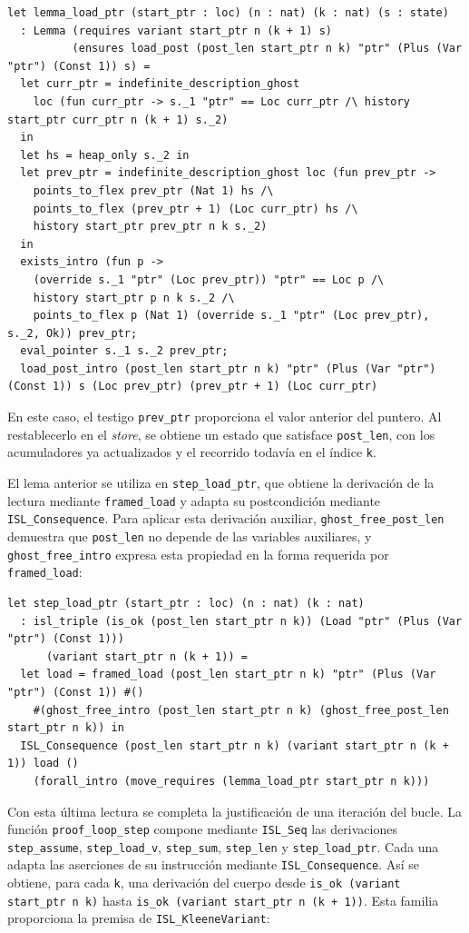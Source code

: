\documentclass[a4paper,	11pt]{report}
\begin{document}
\begin{lstlisting}
let lemma_load_ptr (start_ptr : loc) (n : nat) (k : nat) (s : state)
  : Lemma (requires variant start_ptr n (k + 1) s)
          (ensures load_post (post_len start_ptr n k) "ptr" (Plus (Var "ptr") (Const 1)) s) =
  let curr_ptr = indefinite_description_ghost
    loc (fun curr_ptr -> s._1 "ptr" == Loc curr_ptr /\ history start_ptr curr_ptr n (k + 1) s._2)
  in
  let hs = heap_only s._2 in
  let prev_ptr = indefinite_description_ghost loc (fun prev_ptr ->
    points_to_flex prev_ptr (Nat 1) hs /\
    points_to_flex (prev_ptr + 1) (Loc curr_ptr) hs /\
    history start_ptr prev_ptr n k s._2)
  in
  exists_intro (fun p ->
    (override s._1 "ptr" (Loc prev_ptr)) "ptr" == Loc p /\
    history start_ptr p n k s._2 /\
    points_to_flex p (Nat 1) (override s._1 "ptr" (Loc prev_ptr), s._2, Ok)) prev_ptr;
  eval_pointer s._1 s._2 prev_ptr;
  load_post_intro (post_len start_ptr n k) "ptr" (Plus (Var "ptr") (Const 1)) s (Loc prev_ptr) (prev_ptr + 1) (Loc curr_ptr)
\end{lstlisting}
En este caso,
el testigo \lstinline|prev_ptr| proporciona el valor anterior del puntero.
Al restablecerlo en el \emph{store},
se obtiene un estado que satisface \lstinline|post_len|,
con los acumuladores ya actualizados y el recorrido todavía en el índice \lstinline|k|.

El lema anterior se utiliza en \lstinline|step_load_ptr|,
que obtiene la derivación de la lectura mediante \lstinline|framed_load| y adapta su postcondición mediante \lstinline|ISL_Consequence|.
Para aplicar esta derivación auxiliar,
\lstinline|ghost_free_post_len| demuestra que \lstinline|post_len| no depende de las variables auxiliares,
y \lstinline|ghost_free_intro| expresa esta propiedad en la forma requerida por \lstinline|framed_load|:

\begin{lstlisting}
let step_load_ptr (start_ptr : loc) (n : nat) (k : nat)
  : isl_triple (is_ok (post_len start_ptr n k)) (Load "ptr" (Plus (Var "ptr") (Const 1)))
      (variant start_ptr n (k + 1)) =
  let load = framed_load (post_len start_ptr n k) "ptr" (Plus (Var "ptr") (Const 1)) #()
    #(ghost_free_intro (post_len start_ptr n k) (ghost_free_post_len start_ptr n k)) in
  ISL_Consequence (post_len start_ptr n k) (variant start_ptr n (k + 1)) load ()
    (forall_intro (move_requires (lemma_load_ptr start_ptr n k)))
\end{lstlisting}

Con esta última lectura se completa la justificación de una iteración del bucle.
La función \lstinline|proof_loop_step| compone mediante \lstinline|ISL_Seq| las derivaciones \lstinline|step_assume|,
\lstinline|step_load_v|, \lstinline|step_sum|, \lstinline|step_len| y \lstinline|step_load_ptr|.
Cada una adapta las aserciones de su instrucción mediante \lstinline|ISL_Consequence|.
Así se obtiene,
para cada \lstinline|k|,
una derivación del cuerpo desde \lstinline|is_ok (variant start_ptr n k)| hasta \lstinline|is_ok (variant start_ptr n (k + 1))|.
Esta familia proporciona la premisa de \lstinline|ISL_KleeneVariant|:
\end{document}
